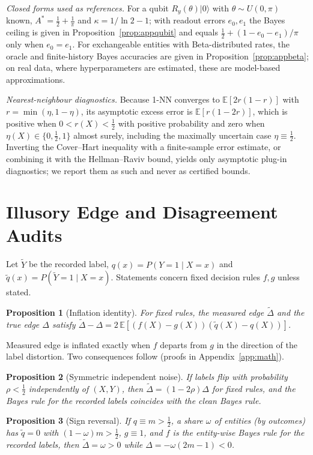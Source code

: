 \documentclass[journal]{IEEEtran}
\newtheorem{proposition}{Proposition}
\theoremstyle{definition}
\newcommand{\E}{\mathbb{E}}
\begin{document}
\emph{Closed forms used as references.} For a qubit $R_y(\theta)\lvert0\rangle$ with $\theta\sim U(0,\pi)$ known, $A^*=\tfrac12+\tfrac1\pi$ and $\kappa=1/\ln2-1$; with readout errors $e_0,e_1$ the Bayes ceiling is given in Proposition~\ref{prop:appqubit} and equals $\tfrac12+(1-e_0-e_1)/\pi$ only when $e_0=e_1$. For exchangeable entities with Beta-distributed rates, the oracle and finite-history Bayes accuracies are given in Proposition~\ref{prop:appbeta}; on real data, where hyperparameters are estimated, these are model-based approximations.

\emph{Nearest-neighbour diagnostics.} Because 1-NN converges to $\E[2r(1-r)]$ with $r=\min(\eta,1-\eta)$, its asymptotic excess error is $\E[r(1-2r)]$, which is positive when $0<r(X)<\tfrac12$ with positive probability and zero when $\eta(X)\in\{0,\tfrac12,1\}$ almost surely, including the maximally uncertain case $\eta\equiv\tfrac12$. Inverting the Cover--Hart inequality with a finite-sample error estimate, or combining it with the Hellman--Raviv bound, yields only asymptotic plug-in diagnostics; we report them as such and never as certified bounds.

\section{Illusory Edge and Disagreement Audits}\label{sec:illusory}
Let $\tilde Y$ be the recorded label, $q(x)=P(Y=1\mid X=x)$ and $\tilde q(x)=P(\tilde Y=1\mid X=x)$. Statements concern fixed decision rules $f,g$ unless stated.

\begin{proposition}[Inflation identity]\label{prop:identity}
For fixed rules, the measured edge $\tilde\Delta$ and the true edge $\Delta$ satisfy $\tilde\Delta-\Delta=2\,\E[(f(X)-g(X))(\tilde q(X)-q(X))]$.
\end{proposition}
Measured edge is inflated exactly when $f$ departs from $g$ in the direction of the label distortion. Two consequences follow (proofs in Appendix~\ref{app:math}).

\begin{proposition}[Symmetric independent noise]\label{prop:ind}
If labels flip with probability $\rho<\tfrac12$ independently of $(X,Y)$, then $\tilde\Delta=(1-2\rho)\Delta$ for fixed rules, and the Bayes rule for the recorded labels coincides with the clean Bayes rule.
\end{proposition}

\begin{proposition}[Sign reversal]\label{prop:persist}
If $q\equiv m>\tfrac12$, a share $\omega$ of entities (by outcomes) has $\tilde q=0$ with $(1-\omega)m>\tfrac12$, $g\equiv1$, and $f$ is the entity-wise Bayes rule for the recorded labels, then $\tilde\Delta=\omega>0$ while $\Delta=-\omega(2m-1)<0$.
\end{proposition}
\end{document}
